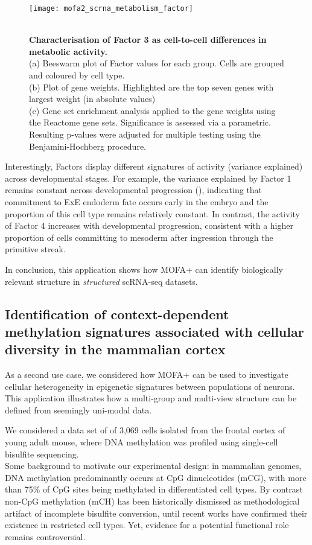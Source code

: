 \begin{figure}[H]
	\centering
	\texttt{[image: mofa2\_scrna\_metabolism\_factor]}
	\caption[]{ \\
	\textbf{Characterisation of Factor 3 as cell-to-cell differences in metabolic activity.} \\
	(a) Beeswarm plot of Factor values for each group. Cells are grouped and coloured by cell type. \\
	(b) Plot of gene weights. Highlighted are the top seven genes with largest weight (in absolute values) \\
	(c) Gene set enrichment analysis applied to the gene weights using the Reactome gene sets\cite{Fabregat2015}. Significance is assessed via a parametric. Resulting p-values were adjusted for multiple testing using the Benjamini-Hochberg procedure.
	}
	\label{fig:mofa2_scrna_metabolism_factor}
\end{figure}

Interestingly, Factors display different signatures of activity (variance explained) across developmental stages. For example, the variance explained by Factor 1 remains constant across developmental progression (), indicating that commitment to ExE endoderm fate occurs early in the embryo and the proportion of this cell type remains relatively constant. In contrast, the activity of Factor 4 increases with developmental progression, consistent with a higher proportion of cells committing to mesoderm after ingression through the primitive streak. 

In conclusion, this application shows how MOFA+ can identify biologically relevant structure in \textit{structured} scRNA-seq datasets.


\subsection{Identification of context-dependent methylation signatures associated with cellular diversity in the mammalian cortex}

As a second use case, we considered how MOFA+ can be used to investigate cellular heterogeneity  in epigenetic signatures between populations of neurons. This application illustrates how a multi-group and multi-view structure can be defined from seemingly uni-modal data.

We considered a data set of of 3,069 cells isolated from the frontal cortex of young adult mouse, where DNA methylation was profiled using single-cell bisulfite sequencing\cite{Luo2018}.\\Some background to motivate our experimental design: in mammalian genomes, DNA methylation predominantly occurs at CpG dinucleotides (mCG), with more than 75\% of CpG sites being methylated in differentiated cell types. By contrast non-CpG methylation (mCH) has been historically dismissed as methodological artifact of incomplete bisulfite conversion, until recent works have confirmed their existence in restricted cell types. Yet, evidence for a potential functional role remains controversial\cite{He2015}.

